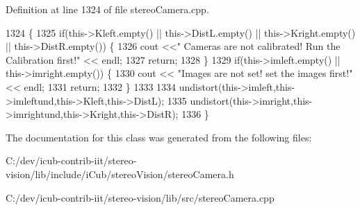 Definition at line 1324 of file stereo\+Camera.\+cpp.


\begin{DoxyCode}
1324                                    \{
1325     \textcolor{keywordflow}{if}(this->Kleft.empty() || this->DistL.empty() || this->Kright.empty() || this->DistR.empty()) \{
1326         cout <<\textcolor{stringliteral}{" Cameras are not calibrated! Run the Calibration first!"} << endl;
1327         \textcolor{keywordflow}{return};
1328     \}
1329     \textcolor{keywordflow}{if}(this->imleft.empty() || this->imright.empty()) \{
1330           cout << \textcolor{stringliteral}{"Images are not set! set the images first!"} << endl;
1331           \textcolor{keywordflow}{return};
1332     \}
1333         
1334     undistort(this->imleft,this->imleftund,this->Kleft,this->DistL);
1335     undistort(this->imright,this->imrightund,this->Kright,this->DistR);
1336 \}
\end{DoxyCode}


The documentation for this class was generated from the following files\+:\begin{DoxyCompactItemize}
\item 
C\+:/dev/icub-\/contrib-\/iit/stereo-\/vision/lib/include/i\+Cub/stereo\+Vision/stereo\+Camera.\+h\item 
C\+:/dev/icub-\/contrib-\/iit/stereo-\/vision/lib/src/stereo\+Camera.\+cpp\end{DoxyCompactItemize}
